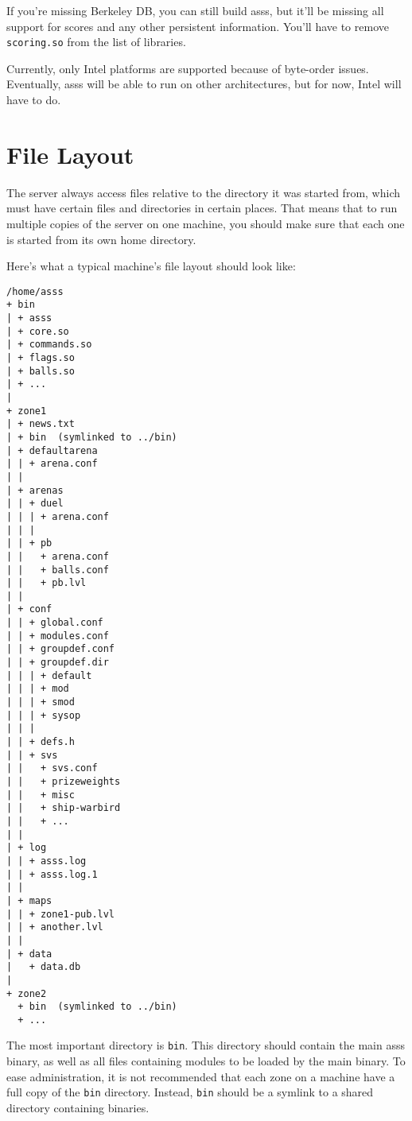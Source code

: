\documentclass{article}
\newcommand{\asss}{asss}
\begin{document}
If you're missing Berkeley DB, you can still build \asss{}, but it'll be
missing all support for scores and any other persistent information.
You'll have to remove \verb/scoring.so/ from the list of libraries.

Currently, only Intel platforms are supported because of byte-order
issues. Eventually, \asss{} will be able to run on other architectures,
but for now, Intel will have to do.


%
%
%


\section{File Layout}
The server always access files relative to the directory it was started
from, which must have certain files and directories in certain places.
That means that to run multiple copies of the server on one machine, you
should make sure that each one is started from its own home directory.

Here's what a typical machine's file layout should look like:
\begin{verbatim}
/home/asss
+ bin
| + asss
| + core.so
| + commands.so
| + flags.so
| + balls.so
| + ...
|
+ zone1
| + news.txt
| + bin  (symlinked to ../bin)
| + defaultarena
| | + arena.conf
| |
| + arenas
| | + duel
| | | + arena.conf
| | |
| | + pb
| |   + arena.conf
| |   + balls.conf
| |   + pb.lvl
| |
| + conf
| | + global.conf
| | + modules.conf
| | + groupdef.conf
| | + groupdef.dir
| | | + default
| | | + mod
| | | + smod
| | | + sysop
| | |
| | + defs.h
| | + svs
| |   + svs.conf
| |   + prizeweights
| |   + misc
| |   + ship-warbird
| |   + ...
| |
| + log
| | + asss.log
| | + asss.log.1
| |
| + maps
| | + zone1-pub.lvl
| | + another.lvl
| |
| + data
|   + data.db
|
+ zone2
  + bin  (symlinked to ../bin)
  + ...
\end{verbatim}

The most important directory is \verb/bin/. This directory should
contain the main \asss{} binary, as well as all files containing modules
to be loaded by the main binary. To ease administration, it is not
recommended that each zone on a machine have a full copy of the
\verb/bin/ directory. Instead, \verb/bin/ should be a symlink to a
shared directory containing binaries.
\end{document}
